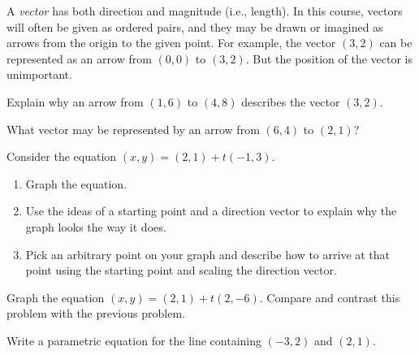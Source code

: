 
A \emph{vector} has both direction and magnitude (i.e., length).  In this course, vectors will often be given as ordered pairs, and they may be drawn or imagined as arrows from the origin to the given point.  For example, the vector $(3,2)$ can be represented as an arrow from $(0,0)$ to $(3,2)$.  But the position of the vector is unimportant.  

\begin{prob}
Explain why an arrow from $(1,6)$ to $(4,8)$ describes the vector $(3,2)$.  
\end{prob}

\begin{prob}
What vector may be represented by an arrow from $(6,4)$ to $(2,1)$?  
\end{prob}

\begin{prob} Consider the equation $(x,y)=(2,1)+t(-1,3)$.  
\begin{enumerate} 
\item Graph the equation.  
\item Use the ideas of a starting point and a direction vector to explain why the graph looks the way it does.   
\item Pick an arbitrary point on your graph and describe how to arrive at that point using the starting point and scaling the direction vector.  
\end{enumerate}
\end{prob}
\begin{prob}  Graph the equation $(x,y) = (2,1) + t(2,-6)$.  Compare and contrast this problem with the previous problem.  
\end{prob}

\begin{prob}  Write a parametric equation for the line containing $(-3, 2)$ and $(2, 1)$.  
\end{prob}


